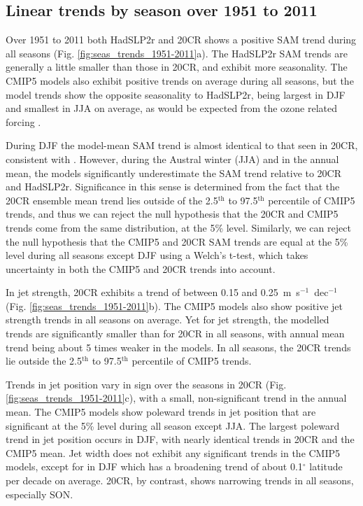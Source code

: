 \documentclass{ametsoc}
\begin{document}
\subsection{Linear trends by season over 1951 to 2011}
Over 1951 to 2011 both HadSLP2r and 20CR shows a positive SAM trend during all seasons 
(Fig. \ref{fig:seas_trends_1951-2011}a). The HadSLP2r SAM trends are generally a little 
smaller than those in 20CR, and exhibit more seasonality. The CMIP5 models also exhibit positive trends 
on average during all seasons, but the model trends show the opposite seasonality to HadSLP2r,
being largest in DJF and smallest in JJA on average, as would be expected from the ozone
related forcing \citep{Son_et_al_2010, Thompson_et_al_2011}. 

During DJF the model-mean SAM trend is almost identical to that seen in 20CR, consistent 
with \cite{Gillett_and_Fyfe_2013}. However, during the Austral winter (JJA) and in the annual 
mean, the models significantly underestimate the SAM trend relative to 20CR and HadSLP2r.
Significance in this sense is determined from the fact that the 20CR ensemble mean trend 
lies outside of the  2.5$^\textrm{th}$ to 97.5$^\textrm{th}$ percentile of CMIP5 trends, 
and thus we can reject the null
hypothesis that the 20CR and CMIP5 trends come from the same distribution, at the 5\% level.
Similarly, we can reject the null hypothesis that the CMIP5 and 20CR SAM trends are equal
at the 5\% level during all seasons except DJF using a Welch's t-test, which takes uncertainty 
in both the CMIP5 and 20CR trends into account.

In jet strength, 20CR exhibits a trend of between 0.15 and 0.25~m~s$^{-1}$~dec$^{-1}$ 
(Fig. \ref{fig:seas_trends_1951-2011}b). The CMIP5 models also show positive jet strength 
trends in all seasons on average. Yet for jet strength, the modelled trends are 
significantly smaller than for 20CR in all seasons, with annual mean trend being about 
5 times weaker in the models. In all seasons, the 20CR trends lie outside 
the 2.5$^\textrm{th}$ to 97.5$^\textrm{th}$ percentile of CMIP5 trends.

Trends in jet position vary in sign over the seasons in 20CR (Fig. \ref{fig:seas_trends_1951-2011}c),
with a small, non-significant trend in the annual mean. The CMIP5 models show poleward trends
in jet position that are significant at the 5\% level during all season except JJA. The largest poleward
trend in jet position occurs in DJF, with nearly identical trends in 20CR and the CMIP5 mean. Jet width
does not exhibit any significant trends in the CMIP5 models, except for in DJF which has a broadening
trend of about 0.1$^{\circ}$ latitude per decade on average. 20CR, by contrast, shows narrowing trends in
all seasons, especially SON.
\end{document}
